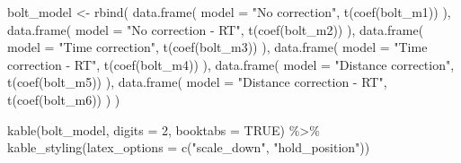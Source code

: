 \documentclass[fleqn,10pt]{wlpeerj} %
\newenvironment{Shaded}{\begin{snugshade}}{\end{snugshade}}
\newcommand{\AttributeTok}[1]{\textcolor[rgb]{0.77,0.63,0.00}{#1}}
\newcommand{\ConstantTok}[1]{\textcolor[rgb]{0.00,0.00,0.00}{#1}}
\newcommand{\DecValTok}[1]{\textcolor[rgb]{0.00,0.00,0.81}{#1}}
\newcommand{\FunctionTok}[1]{\textcolor[rgb]{0.00,0.00,0.00}{#1}}
\newcommand{\NormalTok}[1]{#1}
\newcommand{\OtherTok}[1]{\textcolor[rgb]{0.56,0.35,0.01}{#1}}
\newcommand{\SpecialCharTok}[1]{\textcolor[rgb]{0.00,0.00,0.00}{#1}}
\newcommand{\StringTok}[1]{\textcolor[rgb]{0.31,0.60,0.02}{#1}}
\begin{document}
\begin{Shaded}
\begin{Highlighting}[]
\NormalTok{bolt\_model }\OtherTok{\textless{}{-}} \FunctionTok{rbind}\NormalTok{(}
  \FunctionTok{data.frame}\NormalTok{(}
    \AttributeTok{model =} \StringTok{"No correction"}\NormalTok{,}
    \FunctionTok{t}\NormalTok{(}\FunctionTok{coef}\NormalTok{(bolt\_m1))}
\NormalTok{  ),}
  \FunctionTok{data.frame}\NormalTok{(}
    \AttributeTok{model =} \StringTok{"No correction {-} RT"}\NormalTok{,}
    \FunctionTok{t}\NormalTok{(}\FunctionTok{coef}\NormalTok{(bolt\_m2))}
\NormalTok{  ),}
  \FunctionTok{data.frame}\NormalTok{(}
    \AttributeTok{model =} \StringTok{"Time correction"}\NormalTok{,}
    \FunctionTok{t}\NormalTok{(}\FunctionTok{coef}\NormalTok{(bolt\_m3))}
\NormalTok{  ),}
  \FunctionTok{data.frame}\NormalTok{(}
    \AttributeTok{model =} \StringTok{"Time correction {-} RT"}\NormalTok{,}
    \FunctionTok{t}\NormalTok{(}\FunctionTok{coef}\NormalTok{(bolt\_m4))}
\NormalTok{  ),}
  \FunctionTok{data.frame}\NormalTok{(}
    \AttributeTok{model =} \StringTok{"Distance correction"}\NormalTok{,}
    \FunctionTok{t}\NormalTok{(}\FunctionTok{coef}\NormalTok{(bolt\_m5))}
\NormalTok{  ),}
  \FunctionTok{data.frame}\NormalTok{(}
    \AttributeTok{model =} \StringTok{"Distance correction {-} RT"}\NormalTok{,}
    \FunctionTok{t}\NormalTok{(}\FunctionTok{coef}\NormalTok{(bolt\_m6))}
\NormalTok{  )}
\NormalTok{)}

\FunctionTok{kable}\NormalTok{(bolt\_model, }\AttributeTok{digits =} \DecValTok{2}\NormalTok{, }\AttributeTok{booktabs =} \ConstantTok{TRUE}\NormalTok{) }\SpecialCharTok{\%\textgreater{}\%}
  \FunctionTok{kable\_styling}\NormalTok{(}\AttributeTok{latex\_options =} \FunctionTok{c}\NormalTok{(}\StringTok{"scale\_down"}\NormalTok{, }\StringTok{"hold\_position"}\NormalTok{))}
\end{Highlighting}
\end{Shaded}

\begin{table}[!h]
\centering
{}
\end{table}
\end{document}
